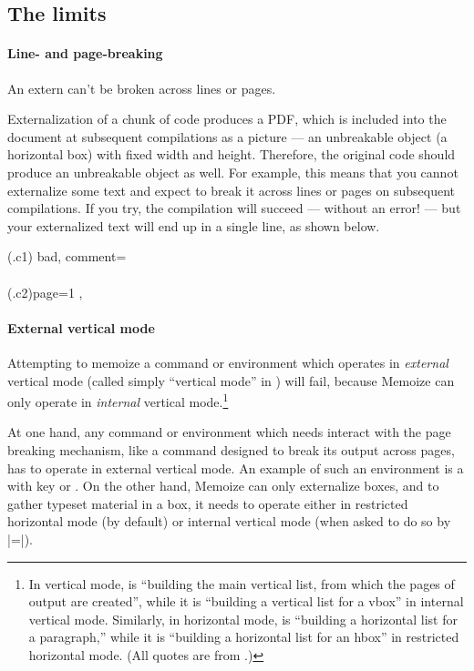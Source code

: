 \documentclass[a4paper,11pt]{article}
\begin{document}
\subsection{The limits}
\label{sec:limits}


\paragraph{Line- and page-breaking} An extern can't be broken across lines or
pages.

Externalization of a chunk of code produces a PDF, which is included into the
document at subsequent compilations as a picture --- an unbreakable object (a
horizontal box) with fixed width and height.  Therefore, the original code
should produce an unbreakable object as well.  For example, this means that you
cannot externalize some text and expect  to break it across lines
or pages on subsequent compilations.  If you try, the compilation will succeed
--- without an error!  --- but your externalized text will end up in a single
line, as shown below.

(.c1){
  bad,
  comment={\centering
    \\[1ex]    
    \\[1ex]
    (.c2){page=1}
  },
}


\paragraph{External vertical mode}

Attempting to memoize a command or environment which operates in
\emph{external} vertical mode (called simply ``vertical mode'' in \TeXbook)
will fail, because Memoize can only operate in \emph{internal} vertical
mode.\footnote{In vertical mode,  is ``building the main vertical
  list, from which the pages of output are created'', while it is ``building a
  vertical list for a vbox'' in internal vertical mode.  Similarly, in
  horizontal mode,  is ``building a horizontal list for a
  paragraph,'' while it is ``building a horizontal list for an hbox'' in
  restricted horizontal mode.  (All quotes are from \TeXbook[85].)}

At one hand, any command or environment which needs interact with the page
breaking mechanism, like a command designed to break its output across pages,
has to operate in external vertical mode.  An example of such an environment is
a  with key  or .  On
the other hand, Memoize can only externalize boxes, and to gather typeset
material in a box, it needs to operate either in restricted horizontal mode (by
default) or internal vertical mode (when asked to do so by
|=|).
\end{document}
